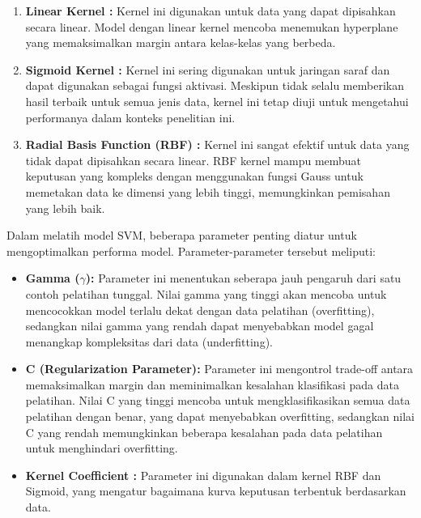 \begin{enumerate}
  \item {\textbf{Linear Kernel :}}
  Kernel ini digunakan untuk data yang dapat dipisahkan secara linear. Model dengan linear kernel mencoba menemukan hyperplane yang memaksimalkan margin antara kelas-kelas yang berbeda.

  \item{\textbf{Sigmoid Kernel :}}
  Kernel ini sering digunakan untuk jaringan saraf dan dapat digunakan sebagai fungsi aktivasi. Meskipun tidak selalu memberikan hasil terbaik untuk semua jenis data, kernel ini tetap diuji untuk mengetahui performanya dalam konteks penelitian ini.

  \item{\textbf{Radial Basis Function (RBF) :}}
  Kernel ini sangat efektif untuk data yang tidak dapat dipisahkan secara linear. RBF kernel mampu membuat keputusan yang kompleks dengan menggunakan fungsi Gauss untuk memetakan data ke dimensi yang lebih tinggi, memungkinkan pemisahan yang lebih baik.
\end{enumerate}

Dalam melatih model SVM, beberapa parameter penting diatur untuk mengoptimalkan performa model. Parameter-parameter tersebut meliputi:

\begin{itemize}
  \item{\textbf{Gamma (\(\gamma\)):}}
  Parameter ini menentukan seberapa jauh pengaruh dari satu contoh pelatihan tunggal. Nilai gamma yang tinggi akan mencoba untuk mencocokkan model terlalu dekat dengan data pelatihan (overfitting), sedangkan nilai gamma yang rendah dapat menyebabkan model gagal menangkap kompleksitas dari data (underfitting).

  \item{\textbf{C (Regularization Parameter):}}
  Parameter ini mengontrol trade-off antara memaksimalkan margin dan meminimalkan kesalahan klasifikasi pada data pelatihan. Nilai C yang tinggi mencoba untuk mengklasifikasikan semua data pelatihan dengan benar, yang dapat menyebabkan overfitting, sedangkan nilai C yang rendah memungkinkan beberapa kesalahan pada data pelatihan untuk menghindari overfitting.
  \item{\textbf{Kernel Coefficient :}}
  Parameter ini digunakan dalam kernel RBF dan Sigmoid, yang mengatur bagaimana kurva keputusan terbentuk berdasarkan data.


\end{itemize}

